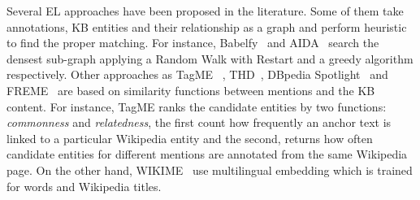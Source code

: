 \documentclass[sigconf]{acmart}
\begin{document}
Several EL approaches have been proposed in the literature. Some of them take annotations, KB entities and their relationship as a graph and perform heuristic to find the proper matching. For instance, Babelfy~\cite{0001RN14} and AIDA~\cite{HoffartYBFPSTTW11} search the densest sub-graph applying a Random Walk with Restart and a greedy algorithm respectively. Other approaches as TagME~\cite{FerraginaS10} , THD~\cite{DojchinovskiK13}, DBpedia Spotlight~\cite{MendesJGB11} and FREME~\cite{SasakiDN16} are based on similarity functions between mentions and the KB content. For instance, TagME ranks the candidate entities by two functions: \textit{commonness} and \textit{relatedness}, the first count how frequently an anchor text is linked to a particular Wikipedia entity and the second, returns how often candidate entities for different mentions are annotated from the same Wikipedia page. On the other hand, WIKIME~\cite{TsaiR16} use multilingual embedding which is trained for words and Wikipedia titles. 

\end{document}
